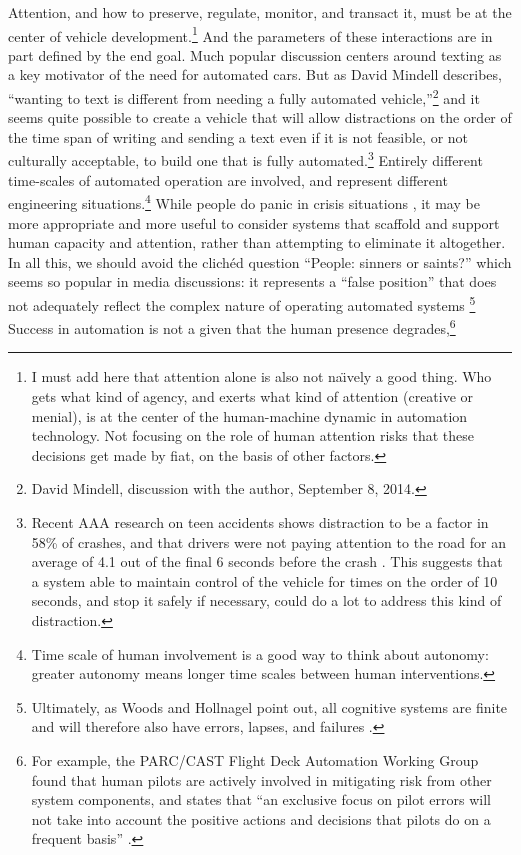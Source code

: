 Attention, and how to preserve, regulate, monitor, and transact it,
must be at the center of vehicle development.\footnote{I must add here
that attention alone is also not na\"{\i}vely a good thing. Who gets what
kind of agency, and exerts what kind of attention (creative or menial), is at the center of
the human-machine dynamic in automation technology. Not focusing on
the role of human attention risks that these decisions get made
by fiat, on the basis of other factors.} And the parameters of
these interactions are in part defined by the end goal. Much popular
discussion centers around texting as a key motivator of the need for
automated cars. But as 
David Mindell describes, ``wanting to text is different
from needing a fully automated vehicle,''\footnote{David Mindell,
  discussion with the author, September 8, 2014.} and it seems quite possible
to create a vehicle that will allow distractions on the order of the
time span of writing and sending a text even if it is not feasible, or
not culturally acceptable, to build one that is fully
automated.\footnote{Recent AAA research on teen accidents shows
  distraction to be a factor in 58\% of crashes, and that drivers were
not paying attention to the road for an average of 4.1 out of the
final 6 seconds before the crash \cite{greenDistraction}. This
suggests that a system able to 
maintain control of the vehicle for times on the order of 10 seconds,
and stop it safely if necessary, could do a lot to address this kind
of distraction.} Entirely different time-scales of automated operation
are involved, and represent different engineering
situations.\footnote{Time scale of human involvement is a good way to
  think about autonomy: greater autonomy means longer time scales
  between human interventions.} While
people do panic in crisis situations \cite{wiseFear},
it may be more appropriate and more useful to consider systems 
that scaffold and support human capacity and attention, rather than
attempting to eliminate it altogether. In
all this, we should avoid the clich\'{e}d question ``People: sinners
or saints?'' which seems so popular in media discussions: it represents
a ``false position'' that does not adequately reflect the complex
nature of operating automated
systems \cite[p. 1]{woodshollnagel}\footnote{Ultimately, as Woods and
Hollnagel point out, all cognitive systems are finite and will
therefore also have errors, lapses, and
failures \cite[p. 1--2]{woodshollnagel}.} Success in automation is not
a given that the human presence degrades,\footnote{For example, the PARC/CAST Flight Deck Automation Working Group
found that human pilots are actively involved in mitigating risk from
other system components, and states that ``an exclusive focus on pilot
errors will not take into account the positive actions and decisions
that pilots do on a frequent basis'' \cite[p. 30]{PARCCAST}.}
